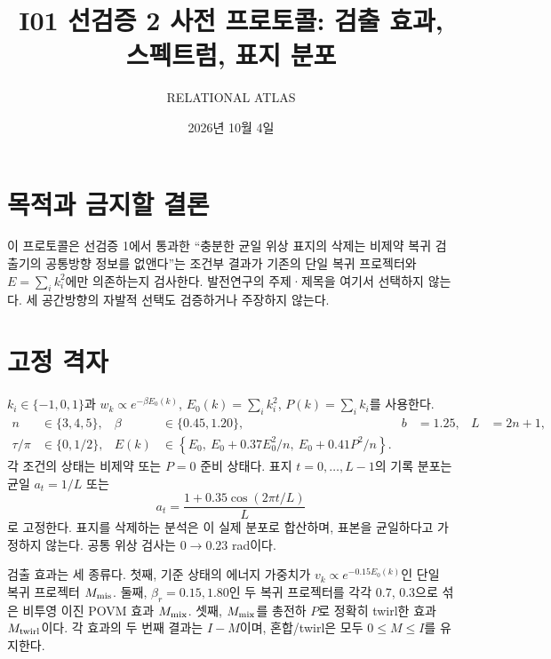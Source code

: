 \documentclass[11pt,a4paper]{article}
\title{I01 선검증 2 사전 프로토콜: 검출 효과, 스펙트럼, 표지 분포}
\author{RELATIONAL ATLAS}
\date{2026년 10월 4일}
\begin{document}
\maketitle

\section{목적과 금지할 결론}
이 프로토콜은 선검증 1에서 통과한 ``충분한 균일 위상 표지의 삭제는
비제약 복귀 검출기의 공통방향 정보를 없앤다''는 조건부 결과가
기존의 단일 복귀 프로젝터와 $E=\sum_i k_i^2$에만 의존하는지 검사한다.
발전연구의 주제·제목을 여기서 선택하지 않는다. 세 공간방향의
자발적 선택도 검증하거나 주장하지 않는다.

\section{고정 격자}
$k_i\in\{-1,0,1\}$과 $w_k\propto e^{-\beta E_0(k)}$,
$E_0(k)=\sum_i k_i^2$, $P(k)=\sum_i k_i$를 사용한다.
\begin{align}
n&\in\{3,4,5\},& \beta&\in\{0.45,1.20\},&
b&=1.25,& L&=2n+1,\\
\tau/\pi&\in\{0,1/2\},&
E(k)&\in\left\{E_0,\ E_0+0.37E_0^2/n,\ E_0+0.41P^2/n\right\}.
\end{align}
각 조건의 상태는 비제약 또는 $P=0$ 준비 상태다.
표지 $t=0,\ldots,L-1$의 기록 분포는 균일 $a_t=1/L$ 또는
\begin{equation}
a_t=\frac{1+0.35\cos(2\pi t/L)}{L}
\end{equation}
로 고정한다. 표지를 삭제하는 분석은 이 실제 분포로 합산하며,
표본을 균일하다고 가정하지 않는다. 공통 위상 검사는
$0\to0.23$ rad이다.

검출 효과는 세 종류다. 첫째, 기준 상태의 에너지 가중치가
$v_k\propto e^{-0.15E_0(k)}$인 단일 복귀 프로젝터 $M_{\rm mis}$.
둘째, $\beta_r=0.15,1.80$인 두 복귀 프로젝터를 각각 0.7, 0.3으로
섞은 비투영 이진 POVM 효과 $M_{\rm mix}$.
셋째, $M_{\rm mix}$를 총전하 $P$로 정확히 twirl한 효과
$M_{\rm twirl}$이다. 각 효과의 두 번째 결과는 $I-M$이며,
혼합/twirl은 모두 $0\le M\le I$를 유지한다.
\end{document}
